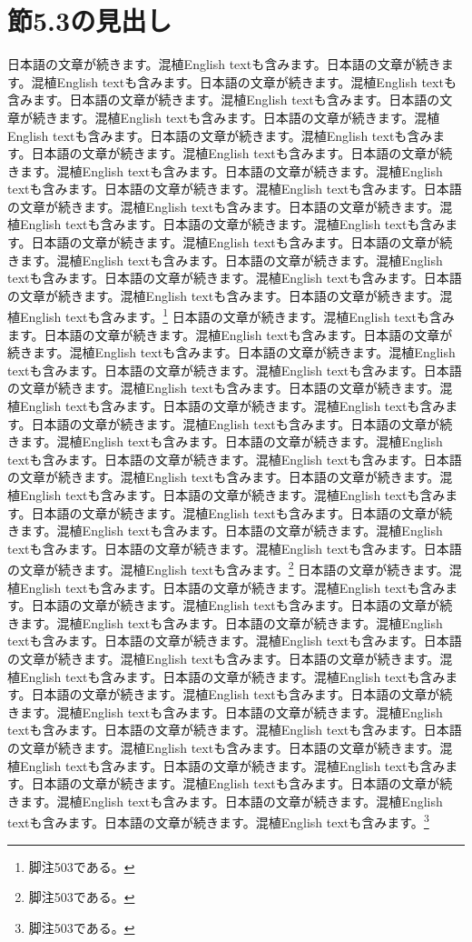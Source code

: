 \documentclass[pdflatex,book]{jlreq}
\begin{document}
\section{節5.3の見出し}
日本語の文章が続きます。混植English textも含みます。日本語の文章が続きます。混植English textも含みます。日本語の文章が続きます。混植English textも含みます。日本語の文章が続きます。混植English textも含みます。日本語の文章が続きます。混植English textも含みます。日本語の文章が続きます。混植English textも含みます。日本語の文章が続きます。混植English textも含みます。日本語の文章が続きます。混植English textも含みます。日本語の文章が続きます。混植English textも含みます。日本語の文章が続きます。混植English textも含みます。日本語の文章が続きます。混植English textも含みます。日本語の文章が続きます。混植English textも含みます。日本語の文章が続きます。混植English textも含みます。日本語の文章が続きます。混植English textも含みます。日本語の文章が続きます。混植English textも含みます。日本語の文章が続きます。混植English textも含みます。日本語の文章が続きます。混植English textも含みます。日本語の文章が続きます。混植English textも含みます。日本語の文章が続きます。混植English textも含みます。日本語の文章が続きます。混植English textも含みます。\footnote{脚注503である。}
日本語の文章が続きます。混植English textも含みます。日本語の文章が続きます。混植English textも含みます。日本語の文章が続きます。混植English textも含みます。日本語の文章が続きます。混植English textも含みます。日本語の文章が続きます。混植English textも含みます。日本語の文章が続きます。混植English textも含みます。日本語の文章が続きます。混植English textも含みます。日本語の文章が続きます。混植English textも含みます。日本語の文章が続きます。混植English textも含みます。日本語の文章が続きます。混植English textも含みます。日本語の文章が続きます。混植English textも含みます。日本語の文章が続きます。混植English textも含みます。日本語の文章が続きます。混植English textも含みます。日本語の文章が続きます。混植English textも含みます。日本語の文章が続きます。混植English textも含みます。日本語の文章が続きます。混植English textも含みます。日本語の文章が続きます。混植English textも含みます。日本語の文章が続きます。混植English textも含みます。日本語の文章が続きます。混植English textも含みます。日本語の文章が続きます。混植English textも含みます。\footnote{脚注503である。}
日本語の文章が続きます。混植English textも含みます。日本語の文章が続きます。混植English textも含みます。日本語の文章が続きます。混植English textも含みます。日本語の文章が続きます。混植English textも含みます。日本語の文章が続きます。混植English textも含みます。日本語の文章が続きます。混植English textも含みます。日本語の文章が続きます。混植English textも含みます。日本語の文章が続きます。混植English textも含みます。日本語の文章が続きます。混植English textも含みます。日本語の文章が続きます。混植English textも含みます。日本語の文章が続きます。混植English textも含みます。日本語の文章が続きます。混植English textも含みます。日本語の文章が続きます。混植English textも含みます。日本語の文章が続きます。混植English textも含みます。日本語の文章が続きます。混植English textも含みます。日本語の文章が続きます。混植English textも含みます。日本語の文章が続きます。混植English textも含みます。日本語の文章が続きます。混植English textも含みます。日本語の文章が続きます。混植English textも含みます。日本語の文章が続きます。混植English textも含みます。\footnote{脚注503である。}
\end{document}
